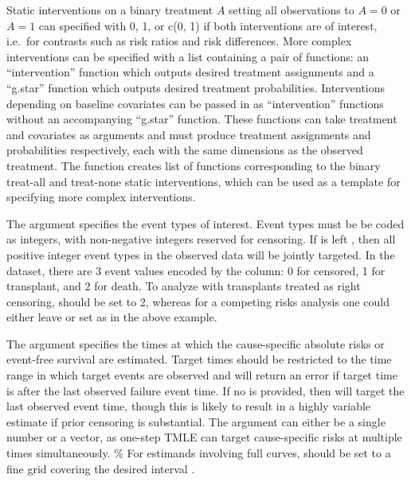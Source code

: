 Static interventions on a binary treatment \(A\) setting all observations to \(A=0\) or \(A=1\) can specified with 0, 1, or c(0, 1) if both interventions are of interest, i.e.~for contrasts such as risk ratios and risk differences. More complex interventions can be specified with a list containing a pair of functions: an ``intervention'' function which outputs desired treatment assignments and a ``g.star'' function which outputs desired treatment probabilities. Interventions depending on baseline covariates can be passed in as ``intervention'' functions without an accompanying ``g.star'' function. These functions can take treatment and covariates as arguments and must produce treatment assignments and probabilities respectively, each with the same dimensions as the observed treatment. The function  creates list of functions corresponding to the binary treat-all and treat-none static interventions, which can be used as a template for specifying more complex interventions.

The  argument specifies the event types of interest. Event types must be be coded as integers, with non-negative integers reserved for censoring. If  is left , then all positive integer event types in the observed data will be jointly targeted. In the  dataset, there are 3 event values encoded by the column: 0 for censored, 1 for transplant, and 2 for death. To analyze  with transplants treated as right censoring,  should be set to 2, whereas for a competing risks analysis one could either leave  or set  as in the above example.

The  argument specifies the times at which the cause-specific absolute risks or event-free survival are estimated. Target times should be restricted to the time range in which target events are observed and  will return an error if target time is after the last observed failure event time. If no  is provided, then  will target the last observed event time, though this is likely to result in a highly variable estimate if prior censoring is substantial. The  argument can either be a single number or a vector, as one-step TMLE can target cause-specific risks at multiple times simultaneously. \% For estimands involving full curves,  should be set to a fine grid covering the desired interval \citep{rytgaard_one-step_2021}.


